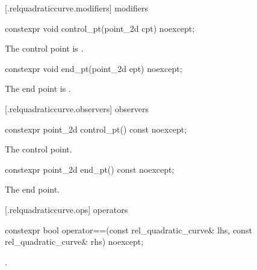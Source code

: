  [\iotwod.relquadraticcurve.modifiers]{ modifiers}

%
\begin{itemdecl}
constexpr void control_pt(point_2d cpt) noexcept;
\end{itemdecl}
\begin{itemdescr}
\pnum
\effects
The control point is .
\end{itemdescr}

%
\begin{itemdecl}
constexpr void end_pt(point_2d ept) noexcept;
\end{itemdecl}
\begin{itemdescr}
\pnum
\effects
The end point is .
\end{itemdescr}

 [\iotwod.relquadraticcurve.observers]{ observers}

%
\begin{itemdecl}
constexpr point_2d control_pt() const noexcept;
\end{itemdecl}
\begin{itemdescr}
\pnum
\returns
The control point.
\end{itemdescr}

%
\begin{itemdecl}
constexpr point_2d end_pt() const noexcept;
\end{itemdecl}
\begin{itemdescr}
\pnum
\returns
The end point.
\end{itemdescr}

 [\iotwod.relquadraticcurve.ops]{ operators}

%
\begin{itemdecl}
constexpr bool operator==(const rel_quadratic_curve& lhs,
  const rel_quadratic_curve& rhs) noexcept;
\end{itemdecl}
\begin{itemdescr}
\pnum
\returns
{}.
\end{itemdescr}

